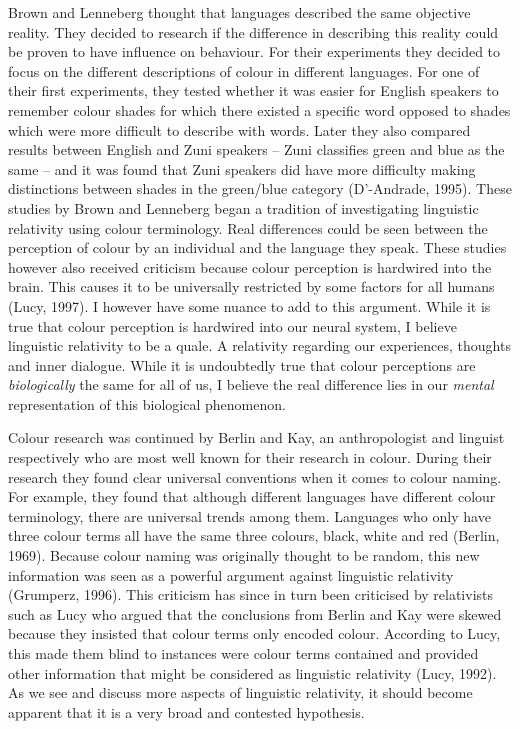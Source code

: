  
\hspace{-0.2cm}Brown and Lenneberg thought that languages described the same objective reality. They decided to research if the difference in describing this reality could be proven to have influence on behaviour. For their experiments they decided to focus on the different descriptions of colour in different languages. For one of their first experiments, they tested whether it was easier for English speakers to remember colour shades for which there existed a specific word opposed to shades which were more difficult to describe with words. Later they also compared results between English and Zuni speakers – Zuni classifies green and blue as the same – and it was found  that Zuni speakers did have more difficulty making distinctions between shades in the green/blue category (D’-Andrade, 1995). These studies by Brown and Lenneberg began a tradition of investigating linguistic relativity using colour terminology. Real differences could be seen between the perception of colour by an individual and the language they speak. These studies however also received criticism because colour perception is hardwired into the brain. This causes it to be universally restricted by some factors for all humans (Lucy, 1997). I however have some nuance to add to this argument. While it is true that colour perception is hardwired into our neural system, I believe linguistic relativity to be a quale. A relativity regarding our experiences, thoughts and inner dialogue. While it is undoubtedly true that colour perceptions are \textit{biologically} the same for all of us, I believe the real difference lies in our \textit{mental} representation of this biological phenomenon.  

 
	Colour research was continued by Berlin and Kay, an anthropologist and linguist respectively who are most well known for their research in colour. During their research they found  clear universal conventions when it comes to colour naming. For example, they found  that although different languages have different colour terminology, there are universal trends among them. Languages who only have three colour terms all have the same three colours, black, white and red (Berlin, 1969). Because colour naming was originally thought to be random, this new information was seen as a powerful argument against linguistic relativity (Grumperz, 1996). This criticism has since in turn been criticised by relativists such as Lucy who argued that the conclusions from Berlin and Kay were skewed because they insisted that colour terms only encoded colour. According to Lucy, this made them blind to instances were colour terms contained and provided other information that might be considered as linguistic relativity (Lucy, 1992). As we see and discuss more aspects of linguistic relativity, it should become apparent that it is a very broad and contested hypothesis.  

